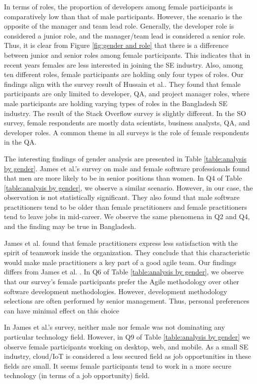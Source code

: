 In terms of roles, the proportion of developers among female participants is comparatively low than that of male participants. However, the scenario is the opposite of the manager and team lead role. Generally, the developer role is considered a junior role, and the manager/team lead is considered a senior role. Thus, it is clear from Figure \ref{fig:gender and role} that there is a difference between junior and senior roles among female participants. This indicates that in recent years females are less interested in joining the SE industry. Also, among ten different roles, female participants are holding only four types of roles. Our findings align with the survey result of Hussain et al.\citep{Hussain2020}. They found that female participants are only limited to developer, QA, and project manager roles, where male participants are holding varying types of roles in the Bangladesh SE industry. The result of the Stack Overflow survey\citep{StackoverflowSurvey2020} is slightly different. In the SO survey, female respondents are mostly data scientists, business analysts, QA, and developer roles. A common theme in all surveys is the role of female respondents in the QA.



The interesting findings of gender analysis are presented in Table \ref{table:analysis by gender}. James et al.'s \citep{James2017} survey on male and female software professionals found that men are more likely to be in senior positions than women. In Q4 of Table \ref{table:analysis by gender}, we observe a similar scenario. However, in our case, the observation is not statistically significant. They also found that male software practitioners tend to be older than female practitioners and female practitioners tend to leave jobs in mid-career. We observe the same phenomena in Q2 and Q4, and the finding may be true in Bangladesh.


James et al.\citep{James2017} found that female practitioners express less satisfaction with the spirit of teamwork inside the organization. They conclude that this characteristic would make male practitioners a key part of a good agile team. Our findings differs from James et al. \citep{James2017}. In Q6 of Table \ref{table:analysis by gender}, we observe that our survey's female participants prefer the Agile methodology over other software development methodologies. However, development methodology selections are often performed by senior management. Thus, personal preferences can have minimal effect on this choice

In James et al.'s survey, neither male nor female was not dominating any particular technology field. However, in Q9 of 
Table \ref{table:analysis by gender} we observe female participants working on desktop, web, and mobile. As a small SE industry, cloud/IoT is considered a less secured field as job opportunities in these fields are small. It seems female participants tend to work in a more secure technology (in terms of a job opportunity) field.